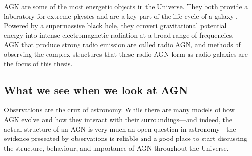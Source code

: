 \documentclass[11pt, a4paper]{book}
\begin{document}
    AGN are some of the most energetic objects in the Universe. They both provide a laboratory for extreme physics and are a key part of the life cycle of a galaxy \citep{heckman_coevolution_2014}. Powered by a supermassive black hole, they convert gravitational potential energy into intense electromagnetic radiation at a broad range of frequencies. AGN that produce strong radio emission are called radio AGN, and methods of observing the complex structures that these radio AGN form as radio galaxies are the focus of this thesis.

    \subsection{What we see when we look at AGN}
    \label{sec:what-we-see-agn}

        Observations are the crux of astronomy. While there are many models of how AGN evolve and how they interact with their surroundings---and indeed, the actual structure of an AGN is very much an open question in astronomy---the evidence presented by observations is reliable and a good place to start discussing the structure, behaviour, and importance of AGN throughout the Universe.
\end{document}
